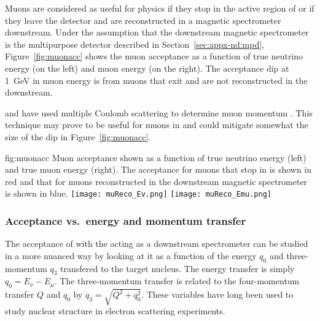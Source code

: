 \label{sec:appx-nd:muacc}

Muons are considered as useful for physics if they stop in the active region of  or if they leave the  detector and are reconstructed in a magnetic spectrometer downstream.  Under the assumption that the downstream magnetic spectrometer is the multipurpose detector described in Section~\ref{sec:appx-nd:mpd}, Figure~\ref{fig:muonacc}  shows the muon acceptance as a function of true neutrino energy (on the left) and muon energy (on the right). The acceptance dip at \SI{1}{GeV} in muon energy is from muons that exit  and are not reconstructed in the  downstream.

 and  have used multiple Coulomb scattering to determine muon momentum \cite{Abratenko:2017nki}.  
This technique may prove to be useful for muons in  and could  mitigate somewhat the size of the dip in Figure~\ref{fig:muonacc}.   

\begin{dunefigure}{fig:muonacc}
{Muon acceptance shown as a function of true neutrino energy (left) and true muon energy (right).  The acceptance for muons that stop in  is shown in red and that for muons reconstructed in the downstream magnetic spectrometer is shown in blue.}
      \texttt{[image: muReco\_Ev.png]}
      \texttt{[image: muReco\_Emu.png]}
\end{dunefigure}

\subsubsection{Acceptance vs.\ energy and momentum transfer}

The acceptance of  with the  acting as a downstream spectrometer can be studied in a more nuanced way by looking at it as a function of the energy $q_0$ and three-momentum $q_3$  transfered to the target nucleus. The energy transfer is simply $q_0=E_\nu - E_\mu$. The three-momentum transfer is related to the four-momentum transfer $Q$ and $q_0$ by $q_3 = \sqrt{Q^2 + q_0^2}$. These variables have long been used to study nuclear structure in electron scattering experiments. 

